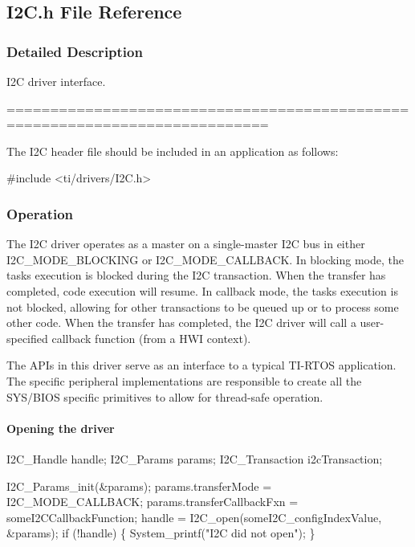 \subsection{I2\+C.\+h File Reference}
\label{_i2_c_8h}


\subsubsection{Detailed Description}
I2\+C driver interface. 

============================================================================

The I2\+C header file should be included in an application as follows\+: 
\begin{DoxyCode}
\textcolor{preprocessor}{#include <ti/drivers/I2C.h>}
\end{DoxyCode}


\subsubsection*{Operation}

The I2\+C driver operates as a master on a single-\/master I2\+C bus in either I2\+C\+\_\+\+M\+O\+D\+E\+\_\+\+B\+L\+O\+C\+K\+I\+N\+G or I2\+C\+\_\+\+M\+O\+D\+E\+\_\+\+C\+A\+L\+L\+B\+A\+C\+K. In blocking mode, the task\textquotesingle{}s execution is blocked during the I2\+C transaction. When the transfer has completed, code execution will resume. In callback mode, the task\textquotesingle{}s execution is not blocked, allowing for other transactions to be queued up or to process some other code. When the transfer has completed, the I2\+C driver will call a user-\/specified callback function (from a H\+W\+I context).

The A\+P\+Is in this driver serve as an interface to a typical T\+I-\/\+R\+T\+O\+S application. The specific peripheral implementations are responsible to create all the S\+Y\+S/\+B\+I\+O\+S specific primitives to allow for thread-\/safe operation.

\paragraph*{Opening the driver}


\begin{DoxyCode}
I2C_Handle      handle;
I2C_Params      params;
I2C_Transaction i2cTransaction;

I2C_Params_init(&params);
params.transferMode  = I2C_MODE_CALLBACK;
params.transferCallbackFxn = someI2CCallbackFunction;
handle = I2C_open(someI2C\_configIndexValue, &params);
\textcolor{keywordflow}{if} (!handle) \{
    System\_printf(\textcolor{stringliteral}{"I2C did not open"});
\}
\end{DoxyCode}


